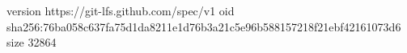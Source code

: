 version https://git-lfs.github.com/spec/v1
oid sha256:76ba058c637fa75d1da8211e1d76b3a21c5e96b588157218f21ebf42161073d6
size 32864
